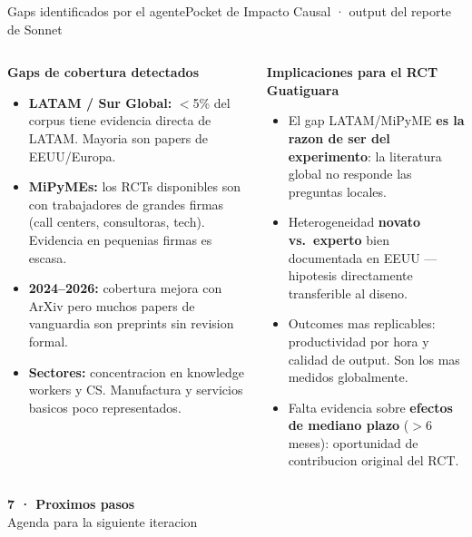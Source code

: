 \documentclass[aspectratio=169,10pt]{beamer}
\newenvironment{card}[1][cardbg]{%
  \begin{tcolorbox}[colback=#1,colframe=bidlight!40,arc=4pt,
    boxrule=0.4pt,left=5pt,right=5pt,top=4pt,bottom=4pt]}%
  {\end{tcolorbox}}
\begin{document}
\begin{frame}{Gaps identificados por el agente}{Pocket de Impacto Causal · output del reporte de Sonnet}
\begin{columns}[T]
\begin{card}
\small\textbf{\color{bidaccent}Gaps de cobertura detectados}\\[5pt]
\scriptsize\color{bidgray}
\begin{itemize}\setlength\itemsep{5pt}
  \item \textbf{LATAM / Sur Global:} $<$5\% del corpus tiene evidencia directa de LATAM. Mayoria son papers de EEUU/Europa.
  \item \textbf{MiPyMEs:} los RCTs disponibles son con trabajadores de grandes firmas (call centers, consultoras, tech). Evidencia en pequenias firmas es escasa.
  \item \textbf{2024--2026:} cobertura mejora con ArXiv pero muchos papers de vanguardia son preprints sin revision formal.
  \item \textbf{Sectores:} concentracion en knowledge workers y CS. Manufactura y servicios basicos poco representados.
\end{itemize}
\end{card}

\begin{card}
\small\textbf{\color{bidaccent}Implicaciones para el RCT Guatiguara}\\[5pt]
\scriptsize\color{bidgray}
\begin{itemize}\setlength\itemsep{5pt}
  \item El gap LATAM/MiPyME \textbf{es la razon de ser del experimento}: la literatura global no responde las preguntas locales.
  \item Heterogeneidad \textbf{novato vs.\ experto} bien documentada en EEUU --- hipotesis directamente transferible al diseno.
  \item Outcomes mas replicables: productividad por hora y calidad de output. Son los mas medidos globalmente.
  \item Falta evidencia sobre \textbf{efectos de mediano plazo} ($>$6 meses): oportunidad de contribucion original del RCT.
\end{itemize}
\end{card}
\end{columns}
\end{frame}

{
\begin{frame}[plain]\vspace{20mm}
\begin{center}
{\Large\bfseries\color{bidaccent}7 · Proximos pasos}\\[5pt]
{\color{bidgray}\normalsize Agenda para la siguiente iteracion}
\end{center}
\end{frame}
}
\end{document}
